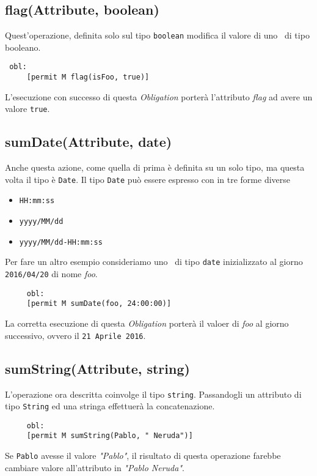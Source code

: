 \subsection*{flag(Attribute, boolean)} %
\label{ssub:opflag}
Quest'operazione, definita solo sul tipo \texttt{boolean} modifica il valore di uno \statusattribute \ di tipo booleano.
\begin{verbatim}
 obl:
     [permit M flag(isFoo, true)]
\end{verbatim}
L'esecuzione con successo di questa \textit{Obligation} porterà l'attributo \textit{flag} ad avere un valore \texttt{true}.

\subsection*{sumDate(Attribute, date)}
\label{ssub:opdate}

Anche questa azione, come quella di prima è definita su un solo tipo, ma questa volta il tipo è \texttt{Date}. Il tipo \texttt{Date} può essere espresso con in tre forme diverse
\begin{itemize}
\item{\texttt{HH:mm:ss}}
\item{\texttt{yyyy/MM/dd}}
\item{\texttt{yyyy/MM/dd-HH:mm:ss}}
\end{itemize}
Per fare un altro esempio consideriamo uno \statusattribute \ di tipo \texttt{date} inizializzato al giorno \texttt{2016/04/20} di nome \textit{foo}.
\begin{verbatim}
	 obl:
     [permit M sumDate(foo, 24:00:00)]
\end{verbatim}
La corretta esecuzione di questa \textit{Obligation} porterà il valoer di \textit{foo} al giorno successivo, ovvero il \texttt{21 Aprile 2016}.

\subsection*{sumString(Attribute, string)}
\label{ssub:opsumstring}

L'operazione ora descritta coinvolge il tipo \texttt{string}. Passandogli un attributo
di tipo \texttt{String} ed una stringa effettuerà la concatenazione.
\begin{verbatim}
	 obl:
     [permit M sumString(Pablo, " Neruda")]
\end{verbatim}
Se \texttt{Pablo} avesse il valore \textit{"Pablo"}, il risultato di questa operazione farebbe cambiare valore all'attributo in \textit{"Pablo Neruda"}.

